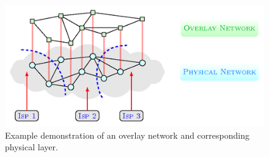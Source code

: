 \documentclass[
  oneside,
  11pt, a4paper,
  footinclude=true,
  headinclude=true,
  cleardoublepage=empty
]{scrbook}
\begin{document}
	\begin{figure}[!h]
    \centering
    \includegraphics[scale=3.0]{img/p2p-topology.png}
    \caption{Example demonstration of an overlay network and corresponding physical layer.}
    \label{fig:overlay-underlay}
    \end{figure}
    
	
\end{document}
